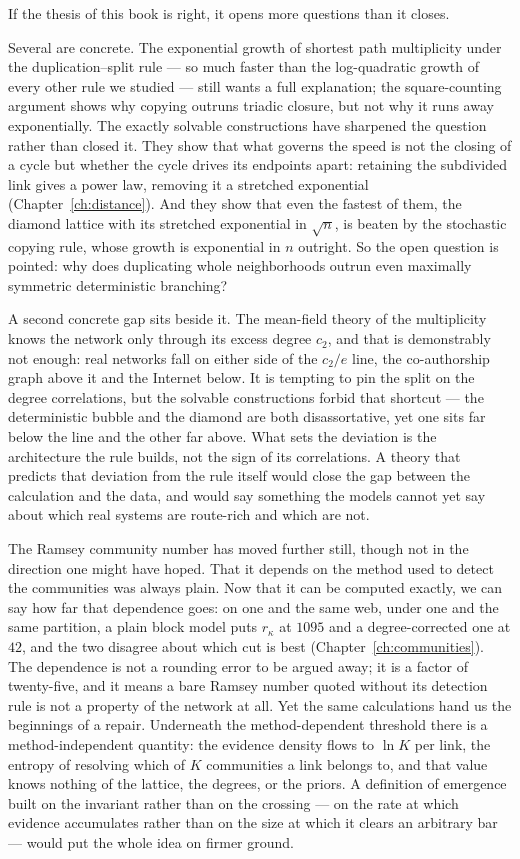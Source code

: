 If the thesis of this book is right, it opens more questions than it closes.

Several are concrete. The exponential growth of shortest path multiplicity under
the duplication--split rule --- so much faster than the log-quadratic growth of
every other rule we studied --- still wants a full explanation; the
square-counting argument shows why copying outruns triadic closure, but not why it
runs away exponentially. The exactly solvable constructions have sharpened the
question rather than closed it. They show that what governs the speed is not the
closing of a cycle but whether the cycle drives its endpoints apart: retaining the
subdivided link gives a power law, removing it a stretched exponential
(Chapter~\ref{ch:distance}). And they show that even the fastest of them, the
diamond lattice with its stretched exponential in $\sqrt{n}$, is beaten by the
stochastic copying rule, whose growth is exponential in $n$ outright. So the
open question is pointed: why does duplicating whole neighborhoods outrun even
maximally symmetric deterministic branching?

A second concrete gap sits beside it. The mean-field theory of the multiplicity
knows the network only through its excess degree $c_2$, and that is demonstrably
not enough: real networks fall on either side of the $c_2/e$ line, the co-authorship
graph above it and the Internet below. It is tempting to pin the split on the
degree correlations, but the solvable constructions forbid that shortcut --- the
deterministic bubble and the diamond are both disassortative, yet one sits far
below the line and the other far above. What sets the deviation is the architecture
the rule builds, not the sign of its correlations. A theory that predicts that
deviation from the rule itself would close the gap between the calculation and the
data, and would say something the models cannot yet say about which real systems
are route-rich and which are not.

The Ramsey community number has moved further still, though not in the direction
one might have hoped. That it depends on the method used to detect the communities
was always plain. Now that it can be computed exactly, we can say how far that
dependence goes: on one and the same web, under one and the same partition, a
plain block model puts $r_\kappa$ at $1095$ and a degree-corrected one at $42$, and
the two disagree about which cut is best (Chapter~\ref{ch:communities}). The dependence is not a rounding error to be
argued away; it is a factor of twenty-five, and it means a bare Ramsey number
quoted without its detection rule is not a property of the network at all. Yet the
same calculations hand us the beginnings of a repair. Underneath the
method-dependent threshold there is a method-independent quantity: the evidence
density flows to $\ln K$ per link, the entropy of resolving which of $K$
communities a link belongs to, and that value knows nothing of the lattice, the
degrees, or the priors. A definition of emergence built on the invariant rather
than on the crossing --- on the rate at which evidence accumulates rather than on
the size at which it clears an arbitrary bar --- would put the whole idea on firmer
ground.

